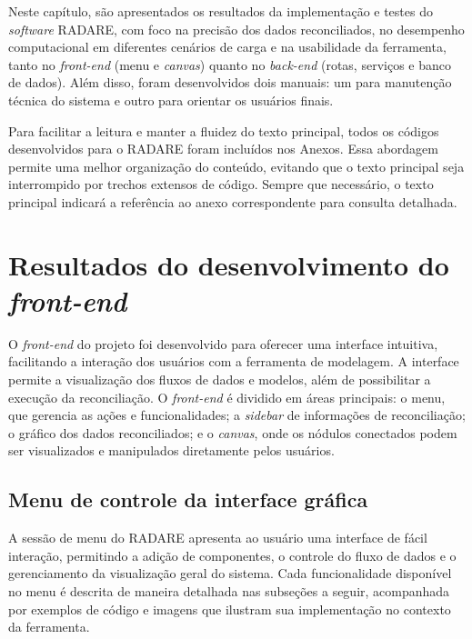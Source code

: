 \label{Cap:Resultados}

Neste capítulo, são apresentados os resultados da implementação e testes do \textit{software} RADARE, com foco na precisão dos dados reconciliados, no desempenho computacional em diferentes cenários de carga e na usabilidade da ferramenta, tanto no \textit{front-end} (menu e \textit{canvas}) quanto no \textit{back-end} (rotas, serviços e banco de dados). Além disso, foram desenvolvidos dois manuais: um para manutenção técnica do sistema e outro para orientar os usuários finais.

Para facilitar a leitura e manter a fluidez do texto principal, todos os códigos desenvolvidos para o RADARE foram incluídos nos Anexos. Essa abordagem permite uma melhor organização do conteúdo, evitando que o texto principal seja interrompido por trechos extensos de código. Sempre que necessário, o texto principal indicará a referência ao anexo correspondente para consulta detalhada.

\section{Resultados do desenvolvimento do \textit{front-end}}

O \textit{front-end} do projeto foi desenvolvido para oferecer uma interface intuitiva, facilitando a interação dos usuários com a ferramenta de modelagem. A interface permite a visualização dos fluxos de dados e modelos, além de possibilitar a execução da reconciliação. O \textit{front-end} é dividido em áreas principais: o menu, que gerencia as ações e funcionalidades; a \textit{sidebar} de informações de reconciliação; o gráfico dos dados reconciliados; e o \textit{canvas}, onde os nódulos conectados podem ser visualizados e manipulados diretamente pelos usuários.

\subsection{Menu de controle da interface gráfica} 

A sessão de menu do RADARE apresenta ao usuário uma interface de fácil interação, permitindo a adição de componentes, o controle do fluxo de dados e o gerenciamento da visualização geral do sistema. Cada funcionalidade disponível no menu é descrita de maneira detalhada nas subseções a seguir, acompanhada por exemplos de código e imagens que ilustram sua implementação no contexto da ferramenta.

